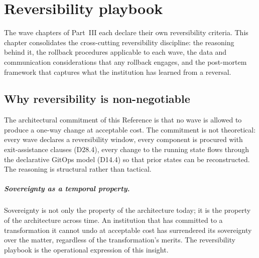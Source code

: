 
\chapter{Reversibility playbook}
\label{ch:reversibility}

The wave chapters of Part~III each declare their own reversibility
criteria. This chapter consolidates the cross-cutting reversibility
discipline: the reasoning behind it, the rollback procedures
applicable to each wave, the data and communication considerations
that any rollback engages, and the post-mortem framework that
captures what the institution has learned from a reversal.

\section{Why reversibility is non-negotiable}
\label{sec:rv-why}

The architectural commitment of this Reference is that no wave is
allowed to produce a one-way change at acceptable cost. The
commitment is not theoretical: every wave declares a reversibility
window, every component is procured with exit-assistance clauses
(D28.4), every change to the running state flows through the
declarative GitOps model (D14.4) so that prior states can be
reconstructed. The reasoning is structural rather than tactical.

\paragraph{Sovereignty as a temporal property.} Sovereignty is not
only the property of the architecture today; it is the property of
the architecture across time. An institution that has committed to
a transformation it cannot undo at acceptable cost has surrendered
its sovereignty over the matter, regardless of the transformation's
merits. The reversibility playbook is the operational expression of
this insight.

